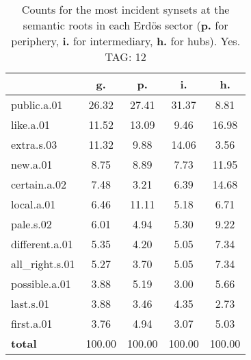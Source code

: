\begin{table}[h!]
\begin{center}
\begin{tabular}{| l || c | c | c | c |}\hline
 & {\bf g.} & {\bf p.} & {\bf i.} & {\bf h.} \\\hline\hline
public.a.01 & 26.32  & 27.41  & 31.37  & 8.81 \\\hline
like.a.01 & 11.52  & 13.09  & 9.46  & 16.98 \\\hline
extra.s.03 & 11.32  & 9.88  & 14.06  & 3.56 \\\hline
new.a.01 & 8.75  & 8.89  & 7.73  & 11.95 \\\hline
certain.a.02 & 7.48  & 3.21  & 6.39  & 14.68 \\\hline
local.a.01 & 6.46  & 11.11  & 5.18  & 6.71 \\\hline
pale.s.02 & 6.01  & 4.94  & 5.30  & 9.22 \\\hline
different.a.01 & 5.35  & 4.20  & 5.05  & 7.34 \\\hline
all\_right.s.01 & 5.27  & 3.70  & 5.05  & 7.34 \\\hline
possible.a.01 & 3.88  & 5.19  & 3.00  & 5.66 \\\hline
last.s.01 & 3.88  & 3.46  & 4.35  & 2.73 \\\hline
first.a.01 & 3.76  & 4.94  & 3.07  & 5.03 \\\hline\hline
{{\bf total}} & 100.00  & 100.00  & 100.00  & 100.00 \\\hline
\end{tabular}
\caption{Counts for the most incident synsets at the semantic roots in each Erd\"os sector ({\bf p.} for periphery, {\bf i.} for intermediary, {\bf h.} for hubs). Yes. TAG: 12}
\end{center}
\end{table}